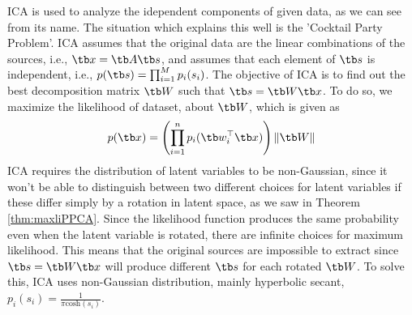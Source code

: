 \documentclass{article}
\begin{document}
        ICA is used to analyze the idependent components of given data, as we can see from its name. The situation which explains this well is the 'Cocktail Party Problem'.
        ICA assumes that the original data are the linear combinations of the sources, i.e., $\tb x = \tb A\tb s$, and assumes that each element of $\tb s$ is independent, i.e., $p(\tb s)=\prod_{i=1}^{M}p_i(s_i)$.
        The objective of ICA is to find out the best decomposition matrix $\tb W$ such that $\tb s = \tb W \tb x$. To do so, we maximize the likelihood of dataset, about $\tb W$, which is given as
        \[
            p(\tb x) = \left( \prod_{i=1}^{n}p_i(\tb w_i^\top \tb x) \right)\|\tb W\|
        \]
        ICA requires the distribution of latent variables to be non-Gaussian, since it won't be able to distinguish between two different choices for latent variables
        if these differ simply by a rotation in latent space, as we saw in Theorem \ref{thm:maxliPPCA}.
        Since the likelihood function produces the same probability even when the latent variable is rotated, there are infinite choices for maximum likelihood. This means that
        the original sources are impossible to extract since $\tb s = \tb W \tb x$ will produce different $\tb s$ for each rotated $\tb W$. To solve this, ICA
        uses non-Gaussian distribution, mainly hyperbolic secant, $p_i(s_i)=\frac{1}{\pi\text{cosh}(s_i)}$.
\end{document}
